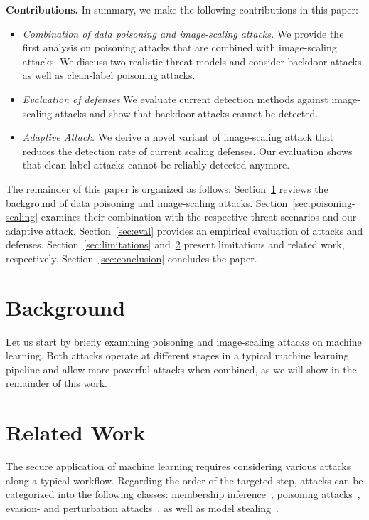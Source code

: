 \documentclass[conference]{IEEEtran}
\renewcommand{\paragraph}[1]{{\vskip 8pt \noindent\bf #1 }}
\begin{document}
\paragraph{Contributions.}  In summary, we make the following
contributions in this paper:
\begin{itemize}  \setlength{\itemsep}{3pt}
	
	\item \emph{Combination of data poisoning and image-scaling 
	attacks.}  
	We provide the first analysis on poisoning attacks that are 
	combined with image-scaling attacks. We discuss two realistic 
	threat models and consider backdoor attacks as well as clean-label 
	poisoning attacks.
		
	\item \emph{Evaluation of defenses} 
	We evaluate current detection methods against image-scaling 
	attacks and show that backdoor attacks cannot be detected.
	
	\item \emph{Adaptive Attack.} We derive a novel variant of
	image-scaling attack that reduces the detection rate 
	of current scaling defenses. Our evaluation 
	shows that clean-label attacks cannot be reliably detected anymore.
\end{itemize}

The remainder of this paper is organized as follows: 
Section~\ref{sec:background} reviews the background of data poisoning 
and image-scaling attacks. Section~\ref{sec:poisoning-scaling} examines 
their combination with the respective threat scenarios and our adaptive 
attack.
Section~\ref{sec:eval} provides an empirical evaluation of attacks and 
defenses.
Section~\ref{sec:limitations} and~\ref{sec:relatedwork} present 
limitations and related work, respectively. 
Section~\ref{sec:conclusion} concludes the paper.



\section{Background}\label{sec:background}
Let us start by briefly examining poisoning and image-scaling 
attacks on machine learning. Both attacks operate at different stages 
in a typical machine learning pipeline and allow more powerful attacks 
when combined, as we will show in the remainder of this work.

 
\section{Related Work}\label{sec:relatedwork}
The secure application of machine learning requires considering 
various attacks along a typical workflow. 
Regarding the order of the targeted step, attacks can be
categorized into the following classes:
membership inference~\citep[e.g.,][]{ShoStrSonShm17}, poisoning 
attacks~\citep[e.g.,][]{BigNelLas11, GuDolGar17, LiuMaAaf+18}, 
evasion- and perturbation
attacks~\citep[e.g.,][]{BigCorMai+13,CarWag17,QuiMaiRie19}, as
well as model stealing~\citep[e.g.,][]{TraZhaJuel+16}.
\end{document}
